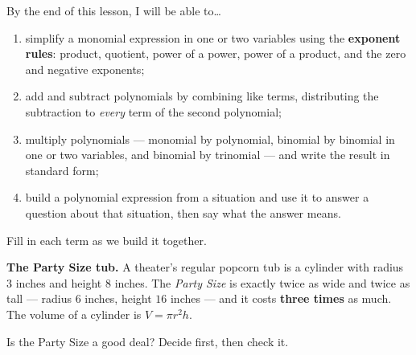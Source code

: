 \documentclass[10pt]{article}
\begin{document}

\vspace{0.15in}

\begin{objectivebox}
\small
By the end of this lesson, I will be able to\dots
\begin{enumerate}[leftmargin=1.5em, itemsep=2pt, topsep=3pt]
  \item simplify a monomial expression in one or two variables using the \textbf{exponent
        rules}: product, quotient, power of a power, power of a product, and the zero and
        negative exponents;
  \item add and subtract polynomials by combining like terms, distributing the subtraction to
        \emph{every} term of the second polynomial;
  \item multiply polynomials --- monomial by polynomial, binomial by binomial in one or two
        variables, and binomial by trinomial --- and write the result in standard form;
  \item build a polynomial expression from a situation and use it to answer a question about
        that situation, then say what the answer means.
\end{enumerate}
\end{objectivebox}

\vspace{0.10in}

\boxguard
\begin{vocabbox}
\small
Fill in each term as we build it together.
\end{vocabbox}

\vspace{0.10in}

\boxguard[11]
\begin{hookbox}
\small
\textbf{The Party Size tub.} A theater's regular popcorn tub is a cylinder with radius $3$ inches
and height $8$ inches. The \emph{Party Size} is exactly twice as wide and twice as tall ---
radius $6$ inches, height $16$ inches --- and it costs \textbf{three times} as much. The volume
of a cylinder is $V=\pi r^2 h$.

Is the Party Size a good deal? Decide first, then check it.

\end{hookbox}
\end{document}
